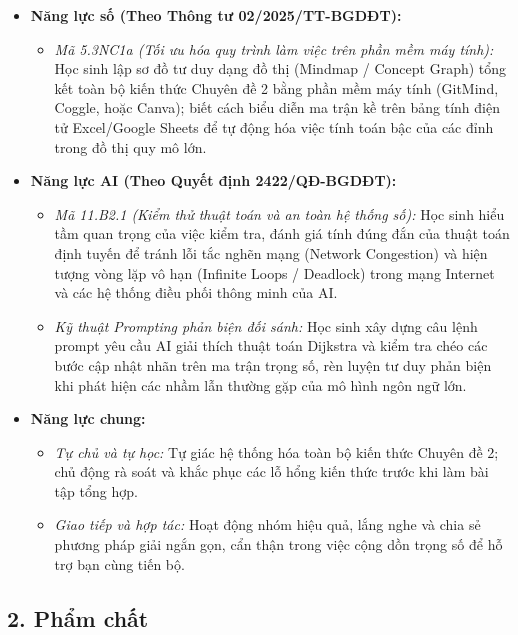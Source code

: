 \documentclass[12pt, a4paper]{article}
\begin{document}
\begin{itemize}[leftmargin=1.2cm]
    \item \textbf{Năng lực số (Theo Thông tư 02/2025/TT-BGDĐT):}
    \begin{itemize}[leftmargin=0.6cm]
        \item \textit{Mã 5.3NC1a (Tối ưu hóa quy trình làm việc trên phần mềm máy tính):} Học sinh lập sơ đồ tư duy dạng đồ thị (Mindmap / Concept Graph) tổng kết toàn bộ kiến thức Chuyên đề 2 bằng phần mềm máy tính (GitMind, Coggle, hoặc Canva); biết cách biểu diễn ma trận kề trên bảng tính điện tử Excel/Google Sheets để tự động hóa việc tính toán bậc của các đỉnh trong đồ thị quy mô lớn.
    \end{itemize}

    \item \textbf{Năng lực AI (Theo Quyết định 2422/QĐ-BGDĐT):}
    \begin{itemize}[leftmargin=0.6cm]
        \item \textit{Mã 11.B2.1 (Kiểm thử thuật toán và an toàn hệ thống số):} Học sinh hiểu tầm quan trọng của việc kiểm tra, đánh giá tính đúng đắn của thuật toán định tuyến để tránh lỗi tắc nghẽn mạng (Network Congestion) và hiện tượng vòng lặp vô hạn (Infinite Loops / Deadlock) trong mạng Internet và các hệ thống điều phối thông minh của AI.
        \item \textit{Kỹ thuật Prompting phản biện đối sánh:} Học sinh xây dựng câu lệnh prompt yêu cầu AI giải thích thuật toán Dijkstra và kiểm tra chéo các bước cập nhật nhãn trên ma trận trọng số, rèn luyện tư duy phản biện khi phát hiện các nhầm lẫn thường gặp của mô hình ngôn ngữ lớn.
    \end{itemize}

    \item \textbf{Năng lực chung:}
    \begin{itemize}[leftmargin=0.6cm]
        \item \textit{Tự chủ và tự học:} Tự giác hệ thống hóa toàn bộ kiến thức Chuyên đề 2; chủ động rà soát và khắc phục các lỗ hổng kiến thức trước khi làm bài tập tổng hợp.
        \item \textit{Giao tiếp và hợp tác:} Hoạt động nhóm hiệu quả, lắng nghe và chia sẻ phương pháp giải ngắn gọn, cẩn thận trong việc cộng dồn trọng số để hỗ trợ bạn cùng tiến bộ.
    \end{itemize}
\end{itemize}

\subsection*{2. Phẩm chất}
\end{document}
